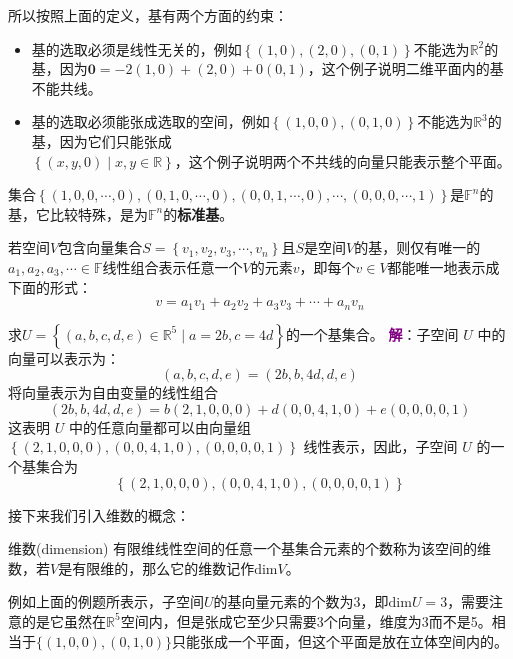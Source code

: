 所以按照上面的定义，基有两个方面的约束：
\begin{itemize}
	\item 基的选取必须是线性无关的，例如$\left\{ (1,0),(2,0),(0,1) \right\}$不能选为$\mathbb{R}^2$的基，因为$\boldsymbol{0}=-2(1,0)+(2,0)+0(0,1)$，这个例子说明二维平面内的基不能共线。
	\item 基的选取必须能张成选取的空间，例如$\left\{ (1,0,0),(0,1,0) \right\}$不能选为$\mathbb{R}^3$的基，因为它们只能张成\\$\left\{ (x,y,0)\mid x,y \in \mathbb{R} \right\}$，这个例子说明两个不共线的向量只能表示整个平面。
\end{itemize}

集合$\left\{ (1,0,0,\cdots,0),(0,1,0,\cdots,0),(0,0,1,\cdots,0),\cdots,(0,0,0,\cdots,1) \right\}$是$\mathbb{F}^n$的基，它比较特殊，是为$\mathbb{F}^n$的\textbf{标准基}。

\begin{corollary}
	若空间$V$包含向量集合$S=\left\{ v_1,v_2,v_3,\cdots,v_n \right\}$且$S$是空间$V$的基，则仅有唯一的$a_1,a_2,a_3,\cdots \in \mathbb{F}$线性组合表示任意一个$V$的元素$v$，即每个$v\in V$都能唯一地表示成下面的形式：$$v=a_1v_1+a_2v_2+a_3v_3+\cdots+a_nv_n$$
\end{corollary}

\begin{example}
	求$U=\left\{ (a,b,c,d,e)\in \mathbb{R}^5 \mid a=2b,c=4d \right\}$的一个基集合。
	\tcblower
	\textcolor{purple}{\textbf{解}}：子空间 $ U $ 中的向量可以表示为：$$(a, b, c, d, e) = (2b, b, 4d, d, e)$$将向量表示为自由变量的线性组合$$(2b, b, 4d, d, e) = b(2, 1, 0, 0, 0) + d(0, 0, 4, 1, 0) + e(0, 0, 0, 0, 1)$$这表明 $ U $ 中的任意向量都可以由向量组 $ \left\{ (2, 1, 0, 0, 0), (0, 0, 4, 1, 0), (0, 0, 0, 0, 1) \right\} $ 线性表示，因此，子空间 $ U $ 的一个基集合为$$\left\{ (2,1,0,0,0), (0,0,4,1,0), (0,0,0,0,1) \right\}$$
\end{example}

接下来我们引入维数的概念：

\begin{definition}{维数(dimension)}
	有限维线性空间的任意一个基集合元素的个数称为该空间的维数，若$V$是有限维的，那么它的维数记作$\text{dim} V$。
\end{definition}

例如上面的例题所表示，子空间$U$的基向量元素的个数为3，即$\text{dim} U=3$，需要注意的是它虽然在$\mathbb{R}^5$空间内，但是张成它至少只需要3个向量，维度为3而不是5。相当于$\{(1,0,0),(0,1,0)\}$只能张成一个平面，但这个平面是放在立体空间内的。

